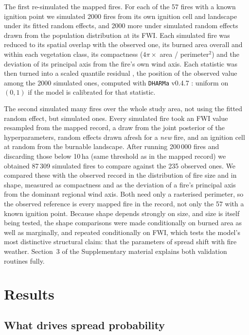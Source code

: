 \documentclass[ResearchPaper,linenum]{CSIRO_LaTeX_Template}
\begin{document}
The first re-simulated the mapped fires. For each of the 57 fires with a known ignition
point we simulated 2000 fires from its own ignition cell and landscape under its fitted
random effects, and 2000 more under simulated random effects drawn from the population
distribution at its FWI. Each simulated fire was reduced to its spatial overlap with
the observed one, its burned area overall and within each vegetation class, its
compactness ($4\pi \times$ area / perimeter$^2$) and the deviation of its principal
axis from the fire's own wind axis. Each statistic was then turned into a scaled
quantile residual \citep{dunn1996randomized}, the position of the observed value among
the 2000 simulated ones, computed with \texttt{DHARMa} v0.4.7 \citep{DHARMa}: uniform
on $(0, 1)$ if the model is calibrated for that statistic.

The second simulated many fires over the whole study area, 
not using the fitted random effect, but simulated ones. 
Every simulated fire took an FWI value
resampled from the mapped record, a draw from the joint posterior of the
hyperparameters, random effects drawn afresh for a \emph{new} fire, and an ignition cell
at random from the burnable landscape.
After running 200\,000 fires and discarding those below 10\,ha 
(same threshold as in the mapped record)
we obtained 87\,309 simulated fires to compare against the 235 observed ones. 
We compared these with the observed
record in the distribution of fire size and in shape, measured as compactness and as the
deviation of a fire's principal axis from the dominant regional wind axis. Both need
only a rasterised perimeter, so the observed reference is every mapped fire in the
record, not only the 57 with a known ignition point. Because shape depends strongly on
size, and size is itself being tested, the shape comparisons were made conditionally on
burned area as well as marginally, and repeated conditionally on FWI, which tests the
model's most distinctive structural claim: that the parameters of spread shift with
fire weather. Section~3 of the Supplementary material explains both validation
routines fully.

\section{Results}

\subsection{What drives spread probability}
\end{document}
